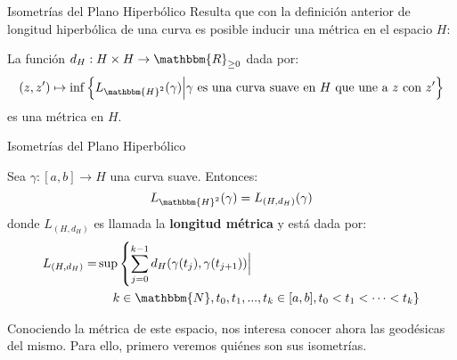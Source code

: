 \documentclass[xcolor=dvipsnames]{beamer}
\theoremstyle{largebreak}
\newcommand\cf[3]{\ensuremath{#1:#2\rightarrow#3}}
\newcommand{\bbm}[1]{\ensuremath{\mathbbm{#1}}}
\begin{document}
\begin{frame}{Isometrías del Plano Hiperbólico}
    Resulta que con la definición anterior de longitud hiperbólica de una curva es posible inducir una métrica en el espacio $H$:

    \begin{propo}
        La función $\cf{d_H}{H\times H}{\bbm{R}_{\geq0}}$ dada por:
        \begin{equation*}
            (z,z')\mapsto\inf\left\{L_{\bbm{H}^2}(\gamma)\Big|\gamma\textup{ es una curva suave en $H$ que une a $z$ con $z'$} \right\}
        \end{equation*}
        es una métrica en $H$.
    \end{propo}
\end{frame}

\begin{frame}{Isometrías del Plano Hiperbólico}
    \begin{propo}
        Sea $\cf{\gamma}{[a,b]}{H}$ una curva suave. Entonces:
        \begin{equation*}
            L_{\bbm{H}^2}(\gamma)=L_{(H,d_H)}(\gamma)
        \end{equation*}
        donde $L_{(H,d_H)}$ es llamada la \textbf{longitud métrica} y está dada por:
        \begin{equation*}
            \begin{split}
                L_{(H,d_H)}=&\sup\left\{\sum_{ j=0}^{k-1}d_H(\gamma(t_j),\gamma(t_{j+1}))\Big| \right.\\
                &\quad\left.k\in\bbm{N}, t_0,t_1,...,t_k\in[a,b], t_0<t_1<\cdots <t_k \right\}\\
            \end{split}
        \end{equation*}
    \end{propo}

    Conociendo la métrica de este espacio, nos interesa conocer ahora las geodésicas del mismo. Para ello, primero veremos quiénes son sus isometrías.
\end{frame}
\end{document}
